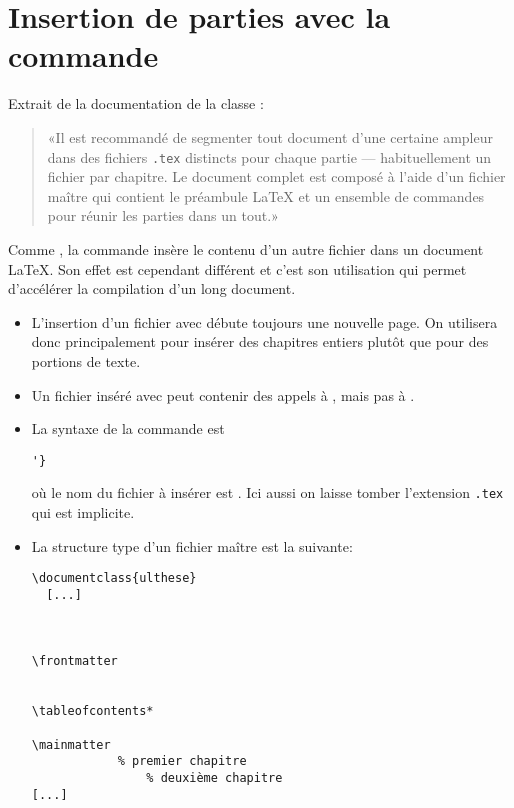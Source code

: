 \section{Insertion de parties avec la commande \code{\string}}
\label{sec:include:include}

Extrait de la documentation de la classe :
\begin{quote}
  «Il est recommandé de segmenter tout document d'une certaine ampleur
  dans des fichiers \verb=.tex= distincts pour chaque partie ---
  habituellement un fichier par chapitre. Le document complet est
  composé à l'aide d'un fichier maître qui contient le préambule
  {\LaTeX} et un ensemble de commandes \verb== pour réunir les
  parties dans un tout.»
\end{quote}

Comme \cmd{}, la commande \cmd{} insère le contenu
d'un autre fichier dans un document {\LaTeX}. Son effet est cependant
différent et c'est son utilisation qui permet d'accélérer la
compilation d'un long document.

\begin{itemize}
\item L'insertion d'un fichier avec \cmd{} débute toujours
  une nouvelle page. On utilisera donc \cmd{} principalement
  pour insérer des chapitres entiers plutôt que pour des portions de
  texte.
\item Un fichier inséré avec \cmd{} peut contenir des appels
  à \cmd{}, mais pas à \cmd{}.
\item La syntaxe de la commande \cmd{} est
\begin{lstlisting}
'}
\end{lstlisting}
  où le nom du fichier à insérer est . Ici
  aussi on laisse tomber l'extension \verb=.tex= qui est implicite.
\item La structure type d'un fichier maître est la suivante:
\begin{lstlisting}
\documentclass{ulthese}
  [...]



\frontmatter


\tableofcontents*

\mainmatter
            % premier chapitre
                % deuxième chapitre
[...]


\end{lstlisting}
\end{itemize}

